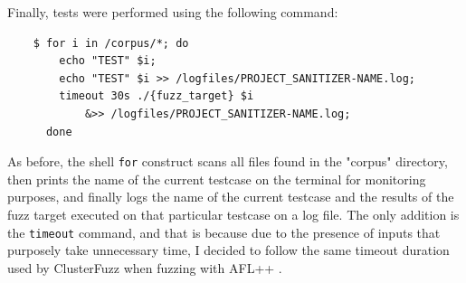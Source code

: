 Finally, tests were performed using the following command:
\begin{verbatim}
    $ for i in /corpus/*; do 
        echo "TEST" $i; 
        echo "TEST" $i >> /logfiles/PROJECT_SANITIZER-NAME.log; 
        timeout 30s ./{fuzz_target} $i 
            &>> /logfiles/PROJECT_SANITIZER-NAME.log; 
      done
\end{verbatim}
As before, the shell \verb|for| construct scans all files found in the "corpus" directory, then prints the name of the current testcase on the terminal for monitoring purposes, and finally logs the name of the current testcase and the results of the fuzz target executed on that particular testcase on a log file. The only addition is the \verb|timeout| command, and that is because due to the presence of inputs that purposely take unnecessary time, I decided to follow the same timeout duration used by ClusterFuzz when fuzzing with AFL++ \cite{timeout}.
